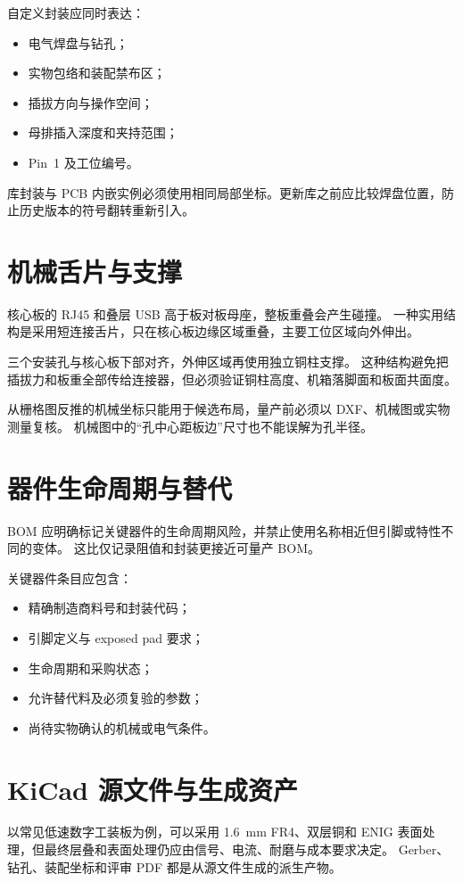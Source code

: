 自定义封装应同时表达：
\begin{itemize}
  \item 电气焊盘与钻孔；
  \item 实物包络和装配禁布区；
  \item 插拔方向与操作空间；
  \item 母排插入深度和夹持范围；
  \item Pin~1 及工位编号。
\end{itemize}

库封装与 PCB 内嵌实例必须使用相同局部坐标。更新库之前应比较焊盘位置，防止历史版本的符号翻转重新引入。

\section{机械舌片与支撑}

核心板的 RJ45 和叠层 USB 高于板对板母座，整板重叠会产生碰撞。
一种实用结构是采用短连接舌片，只在核心板边缘区域重叠，主要工位区域向外伸出。

三个安装孔与核心板下部对齐，外伸区域再使用独立铜柱支撑。
这种结构避免把插拔力和板重全部传给连接器，但必须验证铜柱高度、机箱落脚面和板面共面度。

从栅格图反推的机械坐标只能用于候选布局，量产前必须以 DXF、机械图或实物测量复核。
机械图中的“孔中心距板边”尺寸也不能误解为孔半径。

\section{器件生命周期与替代}

BOM 应明确标记关键器件的生命周期风险，并禁止使用名称相近但引脚或特性不同的变体。
这比仅记录阻值和封装更接近可量产 BOM。

关键器件条目应包含：
\begin{itemize}
  \item 精确制造商料号和封装代码；
  \item 引脚定义与 exposed pad 要求；
  \item 生命周期和采购状态；
  \item 允许替代料及必须复验的参数；
  \item 尚待实物确认的机械或电气条件。
\end{itemize}

\section{KiCad 源文件与生成资产}

以常见低速数字工装板为例，可以采用 1.6~mm FR4、双层铜和 ENIG 表面处理，但最终层叠和表面处理仍应由信号、电流、耐磨与成本要求决定。
Gerber、钻孔、装配坐标和评审 PDF 都是从源文件生成的派生产物。

